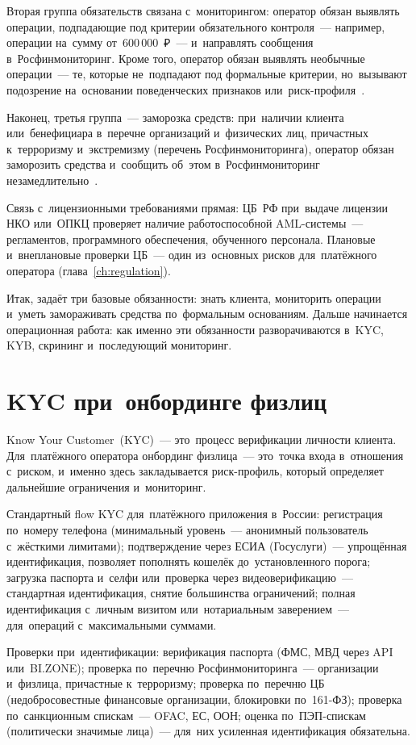 Вторая группа обязательств связана с~мониторингом: оператор обязан выявлять операции,
подпадающие под критерии обязательного контроля~--- например, операции
на~сумму от~600\,000~₽~--- и~направлять сообщения в~Росфинмониторинг.
Кроме того, оператор обязан выявлять необычные операции~--- те, которые
не~подпадают под формальные критерии, но~вызывают подозрение на~основании
поведенческих признаков или~риск-профиля~.

Наконец, третья группа~--- заморозка средств: при~наличии клиента или~бенефициара
в~перечне организаций и~физических лиц, причастных к~терроризму и~экстремизму
(перечень Росфинмониторинга), оператор обязан заморозить средства и~сообщить
об~этом в~Росфинмониторинг незамедлительно~.

Связь с~лицензионными требованиями прямая: ЦБ~РФ при~выдаче лицензии
НКО или~ОПКЦ проверяет наличие работоспособной AML-системы~--- регламентов,
программного обеспечения, обученного персонала. Плановые и~внеплановые
проверки ЦБ~--- один из~основных рисков для~платёжного оператора
(глава~\ref{ch:regulation}).


Итак,  задаёт три базовые обязанности: знать клиента,
мониторить операции и~уметь замораживать средства по~формальным
основаниям. Дальше начинается операционная работа: как именно
эти обязанности разворачиваются в~KYC, KYB, скрининг
и~последующий мониторинг.

\section{KYC при~онбординге физлиц}
\label{sec:compliance-kyc}

Know Your Customer~(KYC)~--- это~процесс верификации личности клиента.
Для~платёжного оператора онбординг физлица~--- это~точка входа в~отношения
с~риском, и~именно здесь закладывается риск-профиль, который определяет
дальнейшие ограничения и~мониторинг.

Стандартный flow KYC для~платёжного приложения в~России: регистрация
по~номеру телефона (минимальный уровень~--- анонимный пользователь
с~жёсткими лимитами); подтверждение через ЕСИА (Госуслуги)~--- упрощённая
идентификация, позволяет пополнять кошелёк до~установленного порога;
загрузка паспорта и~селфи или~проверка через видеоверификацию~---
стандартная идентификация, снятие большинства ограничений; полная
идентификация с~личным визитом или~нотариальным заверением~--- для~операций
с~максимальными суммами.

Проверки при~идентификации: верификация паспорта (ФМС, МВД через API
или~BI.ZONE); проверка по~перечню Росфинмониторинга~--- организации
и~физлица, причастные к~терроризму; проверка по~перечню ЦБ (недобросовестные
финансовые организации, блокировки по~161-ФЗ); проверка по~санкционным
спискам~--- OFAC, ЕС, ООН; оценка по~ПЭП-спискам (политически значимые
лица)~--- для~них усиленная идентификация обязательна.

